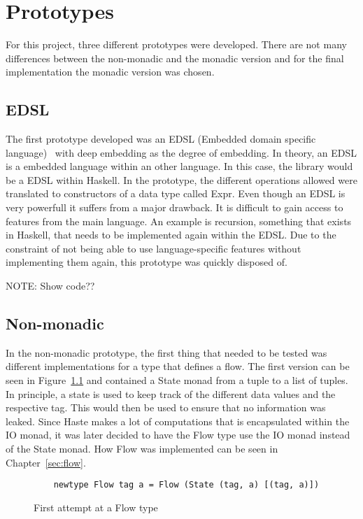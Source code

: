 \chapter{Prototypes}
\label{chapter:prototypes}
For this project, three different prototypes were developed. There are not many differences between the non-monadic and the monadic version and for the final implementation the monadic version was chosen.
\section{EDSL}
The first prototype developed was an EDSL (Embedded domain specific language)~\cite{haskell_edsl} with deep embedding as the degree of embedding. In theory, an EDSL is a embedded language within an other language. In this case, the library would be a EDSL within Haskell. In the prototype, the different operations allowed were translated to constructors of a data type called Expr. Even though an EDSL is very powerfull it suffers from a major drawback. It is difficult to gain access to features from the main language. An example is recursion, something that exists in Haskell, that needs to be implemented again within the EDSL. Due to the constraint of not being able to use language-specific features without implementing them again, this prototype was quickly disposed of.

NOTE: Show code??
\section{Non-monadic}
In the non-monadic prototype, the first thing that needed to be tested was different implementations for a type that defines a flow. The first version can be seen in Figure~\ref{fig:first_flow} and contained a State monad from a tuple to a list of tuples. In principle, a state is used to keep track of the different data values and the respective tag. This would then be used to ensure that no information was leaked. Since Haste makes a lot of computations that is encapsulated within the IO monad, it was later decided to have the Flow type use the IO monad instead of the State monad. How Flow was implemented can be seen in Chapter~\ref{sec:flow}.
\begin{figure}[h]
  \lstset{language=Haskell}
  \begin{lstlisting}
    newtype Flow tag a = Flow (State (tag, a) [(tag, a)])
  \end{lstlisting}
  \caption{First attempt at a Flow type}
  \label{fig:first_flow}
\end{figure}

